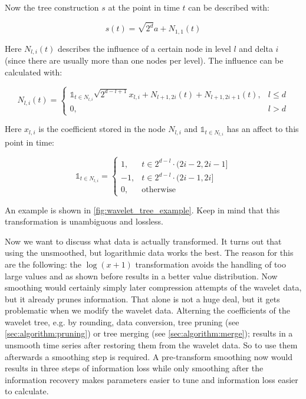 Now the tree construction $s$ at the point in time $t$ can be described with:

\begin{equation}\label{eq:tree}
    s(t) = \sqrt{2^d} a + N_{1,1}(t)
\end{equation}

Here $N_{l, i}(t)$ describes the influence of a certain node in level $l$ and delta $i$ (since there are usually more than one nodes per level). The influence can be calculated with:

\begin{equation}\label{eq:node}
    N_{l, i}(t) = \begin{cases}
        \mathbb{1}_{t \in N_{l, i}} \sqrt{2^{d - l + 1}} x_{l, i} + N_{l + 1, 2i}(t) + N_{l + 1, 2i + 1}(t), & l \leq d \\
        0, & l > d
    \end{cases}
\end{equation}

Here $x_{l, i}$ is the coefficient stored in the node $N_{l, i}$ and $\mathbb{1}_{t \in N_{l, i}}$ has an affect to this point in time:

\begin{equation}\label{eq:matches}
    \mathbb{1}_{t \in N_{l, i}} = \begin{cases}
        1, & t \in 2^{d - l} \cdot (2i - 2, 2i - 1 ] \\
        -1, & t \in 2^{d - l} \cdot (2i - 1, 2i ] \\
        0, & \text{otherwise}
    \end{cases}
\end{equation}

An example is shown in \autoref{fig:wavelet_tree_example}. Keep in mind that this transformation is unambiguous and lossless.

Now we want to discuss what data is actually transformed. It turns out that using the unsmoothed, but logarithmic data works the best. The reason for this are the following: the $\log(x + 1)$ transformation avoids the handling of too large values and as shown before results in a better value distribution. Now smoothing would certainly simply later compression attempts of the wavelet data, but it already prunes information. That alone is not a huge deal, but it gets problematic when we modify the wavelet data. Alterning the coefficients of the wavelet tree, e.g. by rounding, data conversion, tree pruning (see \autoref{sec:algorithm:pruning}) or tree merging (see \autoref{sec:algorithm:merge}); results in a unsmooth time series after restoring them from the wavelet data. So to use them afterwards a smoothing step is required. A pre-transform smoothing now would results in three steps of information loss while only smoothing after the information recovery makes parameters easier to tune and information loss easier to calculate.



